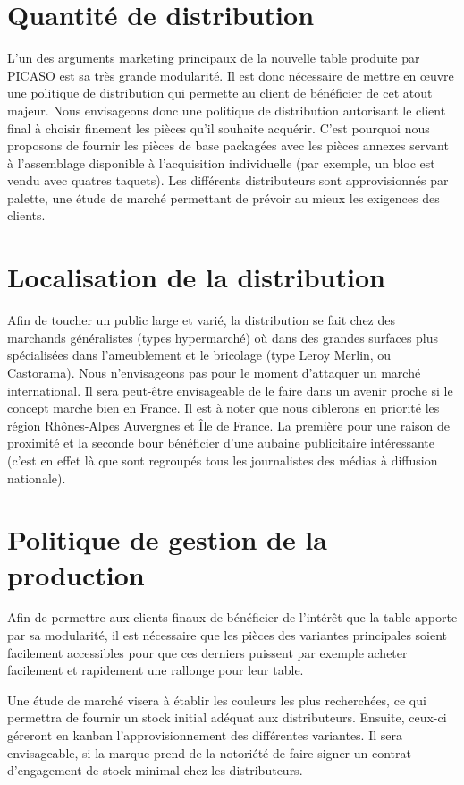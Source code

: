 \section{Quantité de distribution}
L'un des arguments marketing principaux de la nouvelle table 
produite par PICASO est sa très grande modularité. Il est donc
nécessaire de mettre en \oe uvre une politique de distribution qui
permette au client de bénéficier de cet atout majeur. Nous envisageons
donc une politique de distribution autorisant le client final à choisir
finement les pièces qu'il souhaite acquérir. C'est pourquoi nous proposons de
fournir les pièces de base packagées avec les pièces annexes servant à
l'assemblage disponible à l'acquisition individuelle (par exemple, un
bloc est vendu avec quatres taquets). Les différents distributeurs 
sont approvisionnés par palette, une étude de marché permettant de
prévoir au mieux les exigences des clients.

\section{Localisation de la distribution}
Afin de toucher un public large et varié, la distribution se fait chez des
marchands généralistes (types hypermarché) où dans des grandes surfaces
plus spécialisées dans l'ameublement et le bricolage (type Leroy Merlin,
ou Castorama). Nous n'envisageons pas pour le moment d'attaquer un
marché international. Il sera peut-être envisageable de le faire dans un
avenir proche si le concept marche bien en France. Il est à noter que
nous ciblerons en priorité les région Rhônes-Alpes Auvergnes et Île de
France. La première pour une raison de proximité et la seconde bour
bénéficier d'une aubaine publicitaire intéressante (c'est en effet là
que sont regroupés tous les journalistes des médias à diffusion
nationale).

\section{Politique de gestion de la production}
Afin de permettre aux clients finaux de bénéficier de l'intérêt que la
table apporte par sa modularité, il est nécessaire que les pièces des
variantes principales soient facilement accessibles pour que ces
derniers puissent par exemple acheter facilement et rapidement une
rallonge pour leur table.

Une étude de marché visera à établir les couleurs les plus recherchées,
ce qui permettra de fournir un stock initial adéquat aux distributeurs.
Ensuite, ceux-ci géreront en kanban l'approvisionnement des différentes
variantes. Il sera envisageable, si la marque prend de la notoriété de
faire signer un contrat d'engagement de stock minimal chez les
distributeurs.
